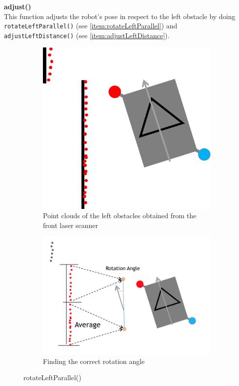 \begin{description}
\item \textbf{adjust()} \hfill \\
This function adjusts the robot's pose in respect to the left obstacle by doing \texttt{rotateLeftParallel()} (see \ref{item:rotateLeftParallel}) and \\ \texttt{adjustLeftDistance()} (see \ref{item:adjustLeftDistance}).
\begin{figure}[ht]
\centering
\begin{subfigure}{.5\textwidth}
	\centering
	\includegraphics[scale=0.65]{graphics/rotate_left_parallel01.png}
	\caption{Point clouds of the left obstacles obtained from the front laser scanner}
	\label{rotate_left_parallel01}
\end{subfigure}%
\begin{subfigure}{.5\textwidth}
	\centering
	\includegraphics[scale=0.55]{graphics/rotate_left_parallel02.png}
	\caption{Finding the correct rotation angle}
	\label{rotate_left_parallel02}
\end{subfigure}
\caption{rotateLeftParallel()}
\label{fig:side_by_side}
\end{figure}


\end{description}
